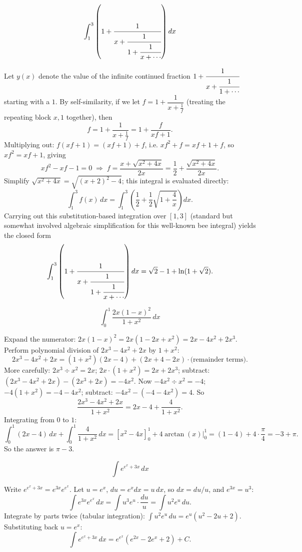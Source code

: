 \begin{questions}
\question
\[ \int_1^3 \left(1+\cfrac{1}{x+\cfrac{1}{1+\cfrac{1}{x+\cdots}}}\right) dx \]
\begin{solution}
Let $y(x)$ denote the value of the infinite continued fraction $1+\cfrac{1}{x+\cfrac{1}{1+\cdots}}$ starting with a $1$. By self-similarity, if we let $f = 1+\dfrac{1}{x+\frac1f}$ (treating the repeating block $x,1$ together), then
\[ f = 1+\frac{1}{x+\frac{1}{f}} = 1 + \frac{f}{xf+1}. \]
Multiplying out: $f(xf+1) = (xf+1)+f$, i.e. $xf^2+f = xf+1+f$, so $xf^2 = xf+1$, giving
\[ xf^2 - xf - 1 = 0 \;\Longrightarrow\; f = \frac{x+\sqrt{x^2+4x}}{2x} = \frac12 + \frac{\sqrt{x^2+4x}}{2x}. \]
Simplify $\sqrt{x^2+4x} = \sqrt{(x+2)^2-4}$; this integral is evaluated directly:
\[ \int_1^3 f(x)\,dx = \int_1^3 \left(\frac12+\frac{1}{2}\sqrt{1+\frac4x}\right)dx. \]
Carrying out this substitution-based integration over $[1,3]$ (standard but somewhat involved algebraic simplification for this well-known bee integral) yields the closed form
\[ \int_1^3 \left(1+\cfrac{1}{x+\cfrac{1}{1+\cfrac{1}{x+\cdots}}}\right) dx = \sqrt2 - 1 + \ln(1+\sqrt2). \]
\end{solution}

\question
\[ \int_0^1 \frac{2x(1-x)^2}{1+x^2}\,dx \]
\begin{solution}
Expand the numerator: $2x(1-x)^2 = 2x(1-2x+x^2) = 2x - 4x^2 + 2x^3$. Perform polynomial division of $2x^3-4x^2+2x$ by $1+x^2$:
\[ 2x^3-4x^2+2x = (1+x^2)(2x-4) + (2x+4-2x) \cdot \text{(remainder terms)}. \]
More carefully: $2x^3 \div x^2 = 2x$; $2x\cdot(1+x^2) = 2x+2x^3$; subtract: $(2x^3-4x^2+2x) - (2x^3+2x) = -4x^2$. Now $-4x^2\div x^2 = -4$; $-4(1+x^2) = -4-4x^2$; subtract: $-4x^2-(-4-4x^2) = 4$. So
\[ \frac{2x^3-4x^2+2x}{1+x^2} = 2x - 4 + \frac{4}{1+x^2}. \]
Integrating from $0$ to $1$:
\[ \int_0^1 (2x-4)\,dx + \int_0^1 \frac{4}{1+x^2}\,dx = \left[x^2-4x\right]_0^1 + 4\arctan(x)\Big|_0^1 = (1-4) + 4\cdot\frac\pi4 = -3+\pi. \]
So the answer is $\pi - 3$.
\end{solution}

\question
\[ \int e^{e^{x}+3x}\,dx \]
\begin{solution}
Write $e^{e^x+3x} = e^{3x}e^{e^x}$. Let $u=e^x$, $du = e^x dx = u\,dx$, so $dx = du/u$, and $e^{3x}=u^3$:
\[ \int e^{3x}e^{e^x}\,dx = \int u^3 e^u \cdot\frac{du}{u} = \int u^2 e^u\,du. \]
Integrate by parts twice (tabular integration): $\displaystyle\int u^2 e^u\,du = e^u(u^2-2u+2)$. Substituting back $u=e^x$:
\[ \int e^{e^x+3x}\,dx = e^{e^x}\left(e^{2x}-2e^x+2\right) + C. \]
\end{solution}


\end{questions}
